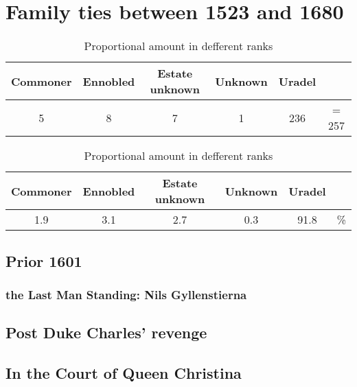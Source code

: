 \section{Family ties between 1523 and 1680}

\begin{table}
	\caption{Absolute amount in different ranks}
	\centering
	\begin{tabular}{cccccc}
		\hline
		Commoner & Ennobled & Estate unknown & Unknown & Uradel & \\
		\hline
		5 & 8 & 7 & 1 & 236 & = 257 \\
		\hline
	\end{tabular}
	\caption{Proportional amount in defferent ranks}
	\centering
	\begin{tabular}{cccccc}
		\hline
	    Commoner & Ennobled & Estate unknown & Unknown & Uradel & \\
	    \hline
	    1.9 & 3.1 & 2.7 & 0.3 & 91.8 & \% \\
	\end{tabular}
\end{table}
\subsection{Prior 1601}
\subsubsection{the Last Man Standing: Nils Gyllenstierna}
\subsection{Post Duke Charles' revenge}
\subsection{In the Court of Queen Christina}